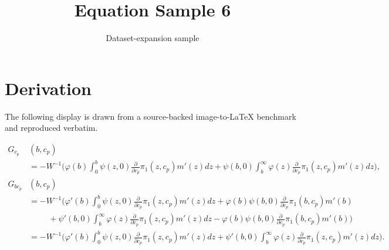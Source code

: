 \documentclass[11pt]{article}
\title{Equation Sample 6}
\author{Dataset-expansion sample}
\date{}
\begin{document}
\maketitle
\section{Derivation}
The following display is drawn from a source-backed image-to-LaTeX benchmark and reproduced verbatim.

\begin{align*}
G_{c_p} &(b,c_p)\\
&=
- W^{-1} \Big( \varphi (b) \int_0^b \psi(z,0) \frac{\partial}{\partial c_p} \pi_1(z,c_p)m'(z)dz + \psi(b,0)\int_b^\infty \varphi(z) \frac{\partial}{\partial c_p} \pi_1(z,c_p)m'(z)dz \Big), \\
G_{b c_p} &(b,c_p) \\
&= - W^{-1} \Big( \varphi' (b) \int_0^b \psi(z,0) \frac{\partial}{\partial c_p} \pi_1(z,c_p)m'(z)dz
+ \varphi (b) \psi(b,0) \frac{\partial}{\partial c_p} \pi_1 (b, c_p) m'(b) \\
&\hspace{1cm} + \psi '(b,0)\int_b^\infty \varphi(z) \frac{\partial}{\partial c_p} \pi_1(z,c_p)m'(z)dz - \varphi (b) \psi(b,0) \frac{\partial}{\partial c_p} \pi_1 (b, c_p) m'(b) \Big) \\
&= - W^{-1} \Big( \varphi' (b) \int_0^b \psi(z,0) \frac{\partial}{\partial c_p} \pi_1(z,c_p)m'(z)dz + \psi '(b,0)\int_b^\infty \varphi(z) \frac{\partial}{\partial c_p} \pi_1(z,c_p)m'(z)dz \Big).
\end{align*}
\end{document}
